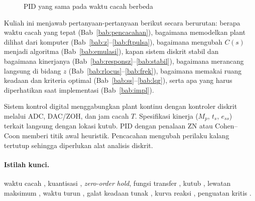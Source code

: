 \begin{figure}[H]
	\centering
	\caption{PID yang sama pada waktu cacah berbeda}
	\label{fig:b1-sampling}
\end{figure}

Kuliah ini menjawab pertanyaan-pertanyaan berikut secara berurutan: berapa waktu cacah yang tepat (Bab~\ref{bab:pencacahan}), bagaimana memodelkan plant dilihat dari komputer (Bab~\ref{bab:z}--\ref{bab:ftpulsa}), bagaimana mengubah $C(s)$ menjadi algoritma (Bab~\ref{bab:emulasi}), kapan sistem diskrit stabil dan bagaimana kinerjanya (Bab~\ref{bab:responsz}--\ref{bab:stabil}), bagaimana merancang langsung di bidang $z$ (Bab~\ref{bab:rlocus}--\ref{bab:frek}), bagaimana memakai ruang keadaan dan kriteria optimal (Bab~\ref{bab:ss}--\ref{bab:lqr}), serta apa yang harus diperhatikan saat implementasi (Bab~\ref{bab:impl}).

\begin{ringkasan}
	Sistem kontrol digital menggabungkan plant kontinu dengan kontroler diskrit melalui ADC, DAC/ZOH, dan jam cacah $T$. Spesifikasi kinerja ($M_p$, $t_s$, $e_{ss}$) terkait langsung dengan lokasi kutub. PID dengan penalaan ZN atau Cohen--Coon memberi titik awal heuristik. Pencacahan mengubah perilaku kalang tertutup sehingga diperlukan alat analisis diskrit.\\[3pt]
\end{ringkasan}

\paragraph{Istilah kunci.} waktu cacah , kuantisasi , \textit{zero-order hold}, fungsi transfer , kutub , lewatan maksimum , waktu turun , galat keadaan tunak , kurva reaksi , penguatan kritis .

